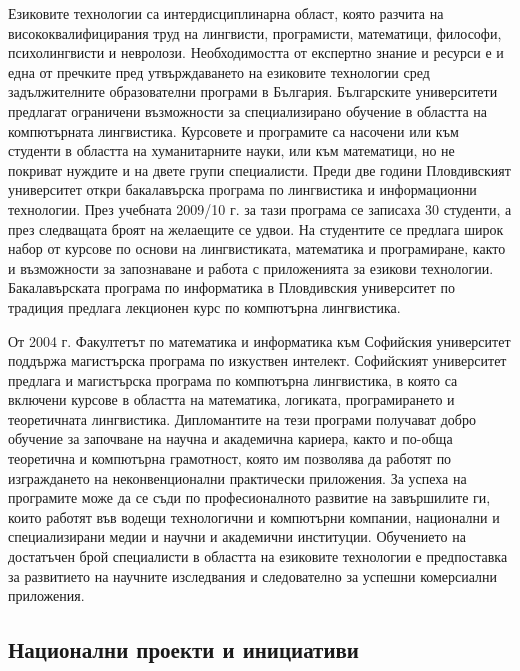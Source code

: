 \begin{multicols}{2}
Езиковите технологии са интердисциплинарна област, която разчита на висококвалифицирания труд на лингвисти, програмисти, математици, философи, психолингвисти и невролози. Необходимостта от експертно знание и ресурси е и една от пречките пред утвърждаването на езиковите технологии сред задължителните образователни програми в България. 
Българските университети предлагат ограничени възможности за специализирано
 обучение в областта на компютърната лингвистика.
 Курсовете и програмите са насочени или
 към студенти в областта на хуманитарните науки, или
 към математици, но не покриват нуждите и на двете
 групи специалисти. Преди две години Пловдивският университет откри бакалавърска програма
 по лингвистика и информационни технологии. През
 учебната 2009/10 г. за тази програма се записаха 30
 студенти, а през следващата броят на желаещите се
 удвои. На студентите се предлага широк набор от курсове
 по
 основи
 на
 лингвистиката, математика
 и
 програмиране, както и възможности за запознаване и
 работа с приложенията за езикови технологии.
 Бакалавърската
 програма
 по
 информатика
 в
 Пловдивския университет по традиция предлага
 лекционен курс по компютърна лингвистика.

От 2004 г. Факултетът по математика и информатика към Софийския университет поддържа магистърска програма
 по
 изкуствен
 интелект.
 Софийският университет предлага и магистърска програма по компютърна лингвистика, в която са включени курсове в
 областта на математика, логиката, програмирането и
 теоретичната лингвистика. Дипломантите на тези програми получават добро
 обучение за започване на научна и академична кариера,
 както и по-обща теоретична и компютърна грамотност,
 която им позволява да работят по изграждането на
 неконвенционални практически приложения. За успеха
 на програмите може да се съди по професионалното
 развитие на завършилите ги, които работят във водещи
 технологични и компютърни компании, национални и
 специализирани медии и научни и академични
 институции.
Обучението на достатъчен брой специалисти в областта на езиковите технологии е предпоставка за развитието на научните изследвания и следователно за успешни комерсиални приложения. 

\subsection{Национални проекти и инициативи}


\end{multicols}
